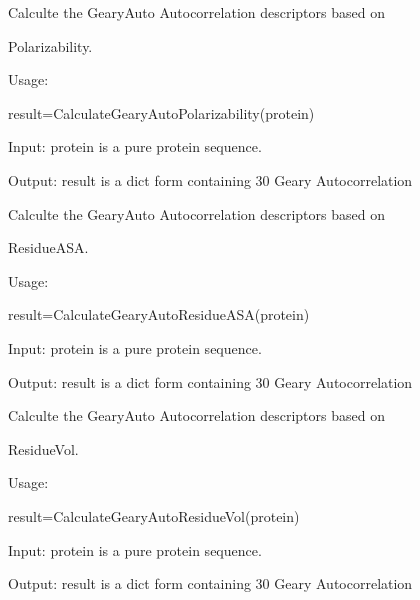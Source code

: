 \documentclass[letterpaper,10pt,english]{sphinxmanual}
\begin{document}

\begin{fulllineitems}
\label{reference/Autocorrelation:Autocorrelation.CalculateGearyAutoPolarizability}
Calculte the GearyAuto Autocorrelation descriptors based on

Polarizability.

Usage:

result=CalculateGearyAutoPolarizability(protein)

Input: protein is a pure protein sequence.

Output: result is a dict form containing 30 Geary Autocorrelation

\end{fulllineitems}


\begin{fulllineitems}
\label{reference/Autocorrelation:Autocorrelation.CalculateGearyAutoResidueASA}
Calculte the GearyAuto Autocorrelation descriptors based on

ResidueASA.

Usage:

result=CalculateGearyAutoResidueASA(protein)

Input: protein is a pure protein sequence.

Output: result is a dict form containing 30 Geary Autocorrelation

\end{fulllineitems}


\begin{fulllineitems}
\label{reference/Autocorrelation:Autocorrelation.CalculateGearyAutoResidueVol}
Calculte the GearyAuto Autocorrelation descriptors based on

ResidueVol.

Usage:

result=CalculateGearyAutoResidueVol(protein)

Input: protein is a pure protein sequence.

Output: result is a dict form containing 30 Geary Autocorrelation

\end{fulllineitems}
\end{document}
